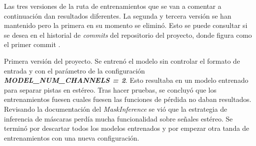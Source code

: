 Las tres versiones de la ruta de entrenamientos que se van a comentar a continuación dan resultados diferentes. La segunda y tercera versión se han mantenido pero la primera en su momento se eliminó. Esto se puede consultar si se desea en el historial de \textit{commits} del repositorio del proyecto, donde figura como el primer commit .

Primera versión del proyecto. Se entrenó el modelo sin controlar el formato de entrada y con el parámetro de la configuración \textit{\textbf{MODEL_NUM_CHANNELS = 2}}. Esto resultaba en un modelo entrenado para separar pistas en estéreo. Tras hacer pruebas, se concluyó que los entrenamientos fuesen cuales fuesen las funciones de pérdida no daban resultados. Revisando la documentación del \textit{MaskInference} se vió que la estrategia de inferencia de máscaras perdía mucha funcionalidad sobre señales estéreo. Se terminó por descartar todos los modelos entrenados y por empezar otra tanda de entrenamientos con una nueva configuración.

